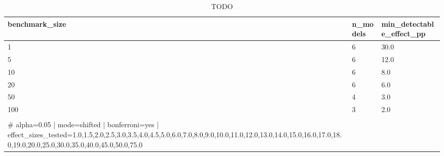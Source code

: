 \begin{table}[htbp]
  \centering
  \begin{tabular}{lll}
    \toprule
    benchmark_size & n_models & min_detectable_effect_pp \\
    \midrule
    1 & 6 & 30.0 \\
    5 & 6 & 12.0 \\
    10 & 6 & 8.0 \\
    20 & 6 & 6.0 \\
    50 & 4 & 3.0 \\
    100 & 3 & 2.0 \\
     &  &  \\
    # alpha=0.05  |  mode=shifted  |  bonferroni=yes  |  effect_sizes_tested=1.0,1.5,2.0,2.5,3.0,3.5,4.0,4.5,5.0,6.0,7.0,8.0,9.0,10.0,11.0,12.0,13.0,14.0,15.0,16.0,17.0,18.0,19.0,20.0,25.0,30.0,35.0,40.0,45.0,50.0,75.0 &  &  \\
    \bottomrule
  \end{tabular}
  \caption{TODO}
  \label{tab:TODO}
\end{table}
